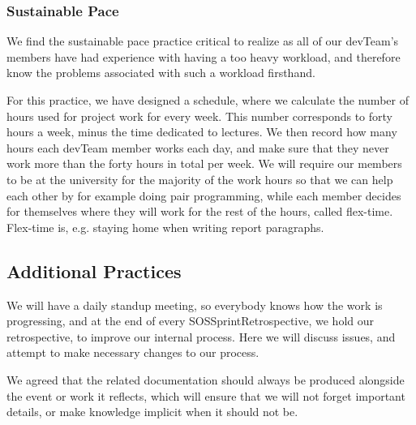 \subsubsection{Sustainable Pace}

We find the sustainable pace practice critical to realize as all of our \gls{devTeam}'s members have had experience with having a too heavy workload, and therefore know the problems associated with such a workload firsthand.

For this practice, we have designed a schedule, where we calculate the number of hours used for project work for every week. This number corresponds to forty hours a week, minus the time dedicated to lectures. We then record how many hours each \gls{devTeam} member works each day, and make sure that they never work more than the forty hours in total per week. We will require our members to be at the university for the majority of the work hours so that we can help each other by for example doing pair programming, while each member decides for themselves where they will work for the rest of the hours, called flex-time. Flex-time is, e.g. staying home when writing report paragraphs.

\subsection{Additional Practices}

We will have a daily standup meeting, so everybody knows how the work is progressing, and at the end of every \gls{SOSSprintRetrospective}, we hold our retrospective, to improve our internal process. Here we will discuss issues, and attempt to make necessary changes to our process.

We agreed that the related documentation should always be produced alongside the event or work it reflects, which will ensure that we will not forget important details, or make knowledge implicit when it should not be.